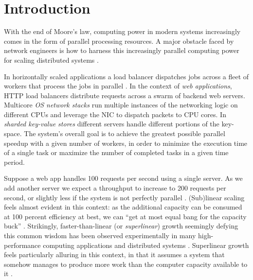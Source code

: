 \section{Introduction}\label{sec:introduction}

With the end of Moore's law, computing power in modern systems increasingly comes in the form of parallel processing resources.  A major obstacle faced by network engineers is how to harness this increasingly parallel computing power for scaling distributed systems \cite{265065, 10.5555/3307441.3307467, 10.1145/2815400.2815423, 10.1145/3098822.3098826, 10.5555/3154630.3154639}.

In horizontally scaled applications a load balancer dispatches jobs across a fleet of workers that process the jobs in parallel \cite{10.5555/3235491}.  In the context of \emph{web applications}, HTTP load balancers \cite{194966, 211279, 9552525} distribute requests across a swarm of backend web servers.  %
Multicore \emph{OS network stacks} \cite{211263, 10.1145/3359989.3365412, 10.1145/3452296.3472914} run multiple instances of the networking logic on different CPUs and leverage the NIC to dispatch packets to CPU cores. %
In \emph{sharded key-value stores} \cite{ghigoff2021bmc} different servers handle different portions of the key-space.  The system's overall goal is to achieve the greatest possible parallel speedup with a given number of workers, in order to minimize the execution time of a single task or maximize the number of completed tasks in a given time period.

Suppose a web app handles 100 requests per second using a single server. As we add another server we expect a throughput to increase to 200 requests per second, or slightly less if the system is not perfectly parallel \cite{10.1145/1465482.1465560}. (Sub)linear scaling feels almost evident in this context: as the additional capacity can be consumed at 100 percent efficiency at best, we can ``get at most equal bang for the capacity buck'' \cite{10.1145/2773212.2789974}. Strikingly, faster-than-linear (or \emph{superlinear}) growth seemingly defying this common wisdom has been observed experimentally in many high-performance computing applications and distributed systems \cite{scalability-analyzed, 10.5555/1012889.1012894, 271208, icsoft20, sdn-analytitcs, 556383, 6483679, 10.1007/978-3-319-77610-1, dobb-1, dobb-2, 10.1145/3627703.3629574, 7733347, 80148}.  Superlinear growth feels particularly alluring in this context, in that it assumes a system that somehow manages to produce more work than the computer capacity available to it \cite{10.1145/2773212.2789974}.

